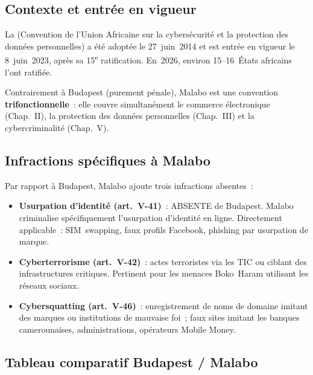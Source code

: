 \subsection{Contexte et entrée en vigueur}

La  (Convention
de l'Union Africaine sur la cybersécurité et la protection des données
personnelles) a été adoptée le 27~juin~2014 et est entrée en vigueur
le 8~juin~2023, après sa 15\textsuperscript{e} ratification.
En~2026, environ 15--16~États africains l'ont ratifiée.

Contrairement à Budapest (purement pénale), Malabo est une convention
\textbf{trifonctionnelle}~: elle couvre simultanément le commerce
électronique (Chap.~II), la protection des données personnelles
(Chap.~III) et la cybercriminalité (Chap.~V).

\subsection{Infractions spécifiques à Malabo}

Par rapport à Budapest, Malabo ajoute trois infractions absentes~:

\begin{itemize}
    \item \textbf{Usurpation d'identité (art.~V-41)}~: ABSENTE de Budapest.
          Malabo criminalise spécifiquement l'usurpation d'identité en
          ligne. Directement applicable~: SIM~swapping, faux profils
          Facebook, phishing par usurpation de marque.
    \item \textbf{Cyberterrorisme (art.~V-42)}~: actes terroristes via
          les TIC ou ciblant des infrastructures critiques. Pertinent
          pour les menaces Boko~Haram utilisant les réseaux sociaux.
    \item \textbf{Cybersquatting (art.~V-46)}~: enregistrement de noms
          de domaine imitant des marques ou institutions de mauvaise foi~;
          faux sites imitant les banques camerounaises, administrations,
          opérateurs Mobile Money.
\end{itemize}

\subsection{Tableau comparatif Budapest / Malabo}

